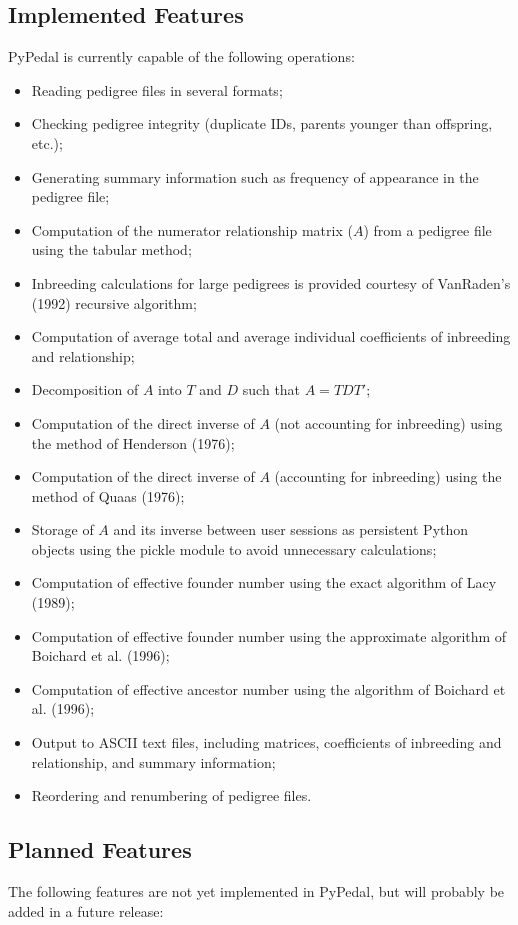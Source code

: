 \subsection{Implemented Features}
PyPedal is currently capable of the following operations:

\begin{itemize}
\item Reading pedigree files in several formats;
\item Checking pedigree integrity (duplicate IDs, parents younger than offspring, etc.);
\item Generating summary information such as frequency of appearance in the pedigree file;
\item Computation of the numerator relationship matrix ($A$) from a pedigree file using the tabular method;
\item Inbreeding calculations for large pedigrees is provided courtesy of Van{R}aden's (1992) recursive algorithm;
\item Computation of average total and average individual coefficients of inbreeding and relationship;
\item Decomposition of $A$ into $T$ and $D$ such that $A=TDT'$;
\item Computation of the direct inverse of $A$ (not accounting for inbreeding) using the method of Henderson (1976);
\item Computation of the direct inverse of $A$ (accounting for inbreeding) using the method of Quaas (1976);
\item Storage of $A$ and its inverse between user sessions as persistent Python objects using the pickle module to avoid unnecessary calculations;
\item Computation of effective founder number using the exact algorithm of Lacy (1989);
\item Computation of effective founder number using the approximate algorithm of Boichard et al. (1996);
\item Computation of effective ancestor number using the algorithm of Boichard et al. (1996);
\item Output to ASCII text files, including matrices, coefficients of inbreeding and relationship, and summary information;
\item Reordering and renumbering of pedigree files.
\end{itemize}

\subsection{Planned Features}
The following features are not yet implemented in PyPedal, but will probably be added in a future release:

